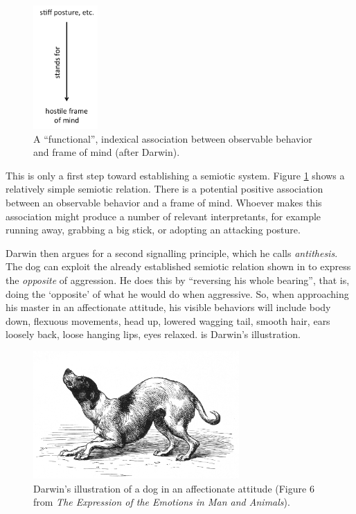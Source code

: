 \begin{figure}[p]
\includegraphics[width=0.22\textwidth,height=\textheight,keepaspectratio]{figures/Fig02}
\caption{A ``functional'', indexical association between observable 
behavior and frame of mind (after Darwin).}
\label{functionalassoc}
\end{figure}


This is only a first step toward establishing a semiotic system. Figure 
\ref{functionalassoc} shows a relatively simple semiotic relation. There is a potential positive association between an 
observable behavior and a frame of mind. Whoever makes this association might produce a 
number of relevant interpretants, for example running away, grabbing a big 
stick, or adopting an attacking posture. 



Darwin then argues for a second signalling principle, which he calls \textit{antithesis}. The dog can exploit the already established semiotic 
relation shown in  to express the \textit{opposite} 
of aggression. He does this by ``reversing his whole bearing'', that is, doing the 
`opposite' of what he would do when aggressive. So, when approaching 
his master in an affectionate attitude, his visible behaviors will include body 
down, flexuous movements, head up, lowered wagging tail, smooth hair, 
ears loosely back, loose hanging lips, eyes relaxed.  is 
Darwin's illustration.


\begin{figure}[h]
\includegraphics[width=0.70\textwidth,keepaspectratio]{figures/Fig03}
\caption{Darwin's illustration of a dog in an affectionate attitude 
(Figure 6 from \textit{The Expression of the Emotions in Man and 
Animals}).}
\label{darwin2}
\end{figure}





